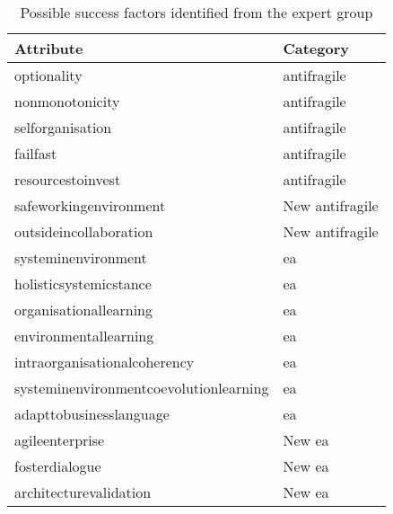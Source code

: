 \begin{table}[H]
	\begin{center}
		\begin{tabular}{@{}ll@{}}
			\toprule%
			\textbf{Attribute} & \textbf{Category}  \\%
			\midrule%
			\Gls{optionality} & \Gls{antifragile} \\%
			\Gls{nonmonotonicity} & \Gls{antifragile} \\%
			\Gls{selforganisation} & \Gls{antifragile} \\%
			\Gls{failfast} & \Gls{antifragile} \\%
			\Gls{resourcestoinvest} & \Gls{antifragile} \\%
			\Gls{safeworkingenvironment} & New \Gls{antifragile} \\%
			\Gls{outsideincollaboration} & New \Gls{antifragile} \\%
			\Gls{systeminenvironment} & \acrlong{ea} \\%
			\Gls{holisticsystemicstance} & \acrlong{ea} \\%
			\Gls{organisationallearning} & \acrlong{ea} \\%
			\Gls{environmentallearning} & \acrlong{ea} \\%
			\Gls{intraorganisationalcoherency} & \acrlong{ea} \\%
			\Gls{systeminenvironmentcoevolutionlearning} & \acrlong{ea} \\%
			\Gls{adapttobusinesslanguage} & \acrlong{ea} \\%
			\Gls{agileenterprise} & New \acrlong{ea} \\%
			\Gls{fosterdialogue} & New \acrlong{ea} \\%
			\Gls{architecturevalidation} & New \acrlong{ea} \\%
			\bottomrule%
		\end{tabular}
		\caption[Possible success factors identified from the expert group]{Possible success factors identified from the expert group}
		\label{tab:expertgrouppossiblesf}
	\end{center}
\end{table}

